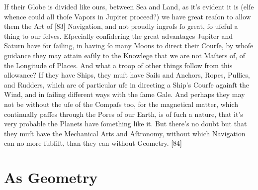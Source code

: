 \documentclass[letterpaper]{book}
\begin{document}
If their Globe is divided like ours, between Sea and Land, as it's evident it
is (elſe whence could all thoſe Vapors in Jupiter proceed?) we have great
reaſon to allow them the Art of [83] Navigation, and not proudly ingroſs
ſo great, ſo uſeful a thing to our ſelves. Eſpecially conſidering the great
advantages Jupiter and Saturn have for ſailing, in having ſo many Moons
to direct their Courſe, by whoſe guidance they may attain eaſily to the
Knowlege that we are not Maſters of, of the Longitude of Places. And what
a troop of other things follow from this allowance? If they have Ships, they
muſt have Sails and Anchors, Ropes, Pullies, and Rudders, which are of
particular uſe in directing a Ship's Courſe againſt the Wind, and in ſailing
different ways with the ſame Gale. And perhaps they may not be without the
uſe of the Compaſs too, for the magnetical matter, which continually paſſes
through the Pores of our Earth, is of ſuch a nature, that it's very probable
the Planets have ſomething like it. But there's no doubt but that they muſt
have the Mechanical Arts and Aſtronomy, without which Navigation can no
more ſubſiſt, than they can without Geometry.
[84]


\section{As Geometry}
\end{document}
